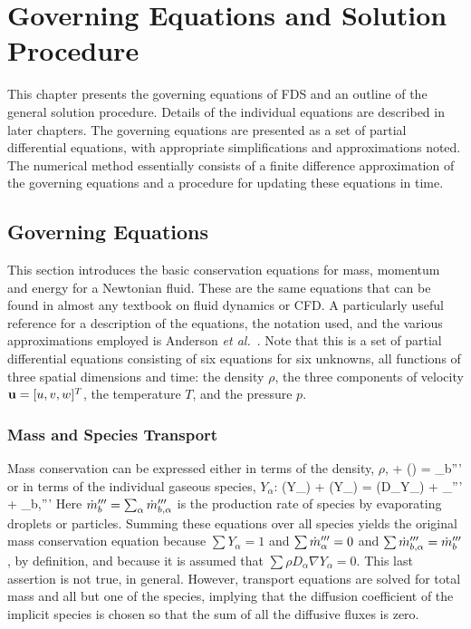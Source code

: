 \chapter{Governing Equations and Solution Procedure}

\label{basisformodel}

This chapter presents the governing equations of FDS and an outline of the general solution procedure. Details of the individual equations
are described in later chapters.
The governing equations are presented as a set of
partial differential equations, with appropriate simplifications and approximations
noted. The numerical method essentially consists of a finite difference approximation of the governing equations and a procedure for
updating these equations in time.

\section{Governing Equations}
\label{govequations}

This section introduces the basic conservation equations for mass, momentum and energy for a
Newtonian fluid. These are the same equations that can
be found in almost any textbook on fluid dynamics or CFD. A particularly useful
reference for a description of the equations, the notation used,
and the various approximations employed is Anderson {\em et al.}~\cite{Anderson:1}.
Note that this is a set of partial differential equations consisting of
six equations for six unknowns, all functions of three spatial dimensions and time:
the density $\rho$, the three components
of velocity ${\bf u}=[u,v,w]^T$, the temperature $T$, and the pressure $p$.

\subsection{Mass and Species Transport}

Mass conservation can be expressed either in terms of the density, $\rho$,
\be {} + \nabla\!\cdot (\rho \bu)  =  \dm_b'''  \label{mass} \ee
or in terms of the individual gaseous species, $Y_\alpha$:
\be {}(\rho Y_\alpha) + \nabla\!\cdot (\rho Y_\alpha \bu) = \nabla\!\cdot (\rho D_\alpha \nabla Y_\alpha) + \dm_\alpha''' + \dm_{b,\alpha}''' \label{species} \ee
Here $\dot{m}_b'''=\sum_\alpha \dot{m}_{b,\alpha}'''$ is the production rate of species by evaporating droplets or particles.
Summing these equations over all species yields the original mass conservation equation because
$\sum Y_\alpha=1$ and $\sum \dot{m}_\alpha''' = 0$ and $\sum \dot{m}_{b,\alpha}'''=\dot{m}_b'''$, by definition, and because it is assumed
that $\sum \rho D_\alpha \nabla Y_\alpha = 0$. This last assertion is not true, in general. However, transport equations are solved for total
mass and all but one of the species, implying that the diffusion coefficient of the implicit species is chosen so that the sum of all the
diffusive fluxes is zero.

